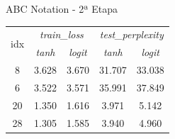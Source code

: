 \documentclass[xcolor=table]{beamer}
\begin{document}
    \begin{frame}{ABC Notation - 2ª Etapa}
        \large
        \begin{table}
            \centering
            \begin{tabular}{c|cc|cc}
                \toprule
                \multirow{2}{*}{idx} &
                \multicolumn{2}{c}{\textit{train\_loss}} &
                \multicolumn{2}{c}{\textit{test\_perplexity}} \\
                & {\textit{tanh}} & {\textit{logit}} & {\textit{tanh}} & {\textit{logit}} \\
                \midrule
                8 & 3.628 & 3.670 & 31.707 & 33.038 \\
                6 & 3.522 & 3.571 & 35.991 & 37.849 \\
                20 & 1.350 & 1.616 & 3.971 & 5.142 \\
                28 & 1.305 & 1.585 & 3.940 & 4.960 \\
                \bottomrule
            \end{tabular}
        \end{table}
    \end{frame}
\end{document}
